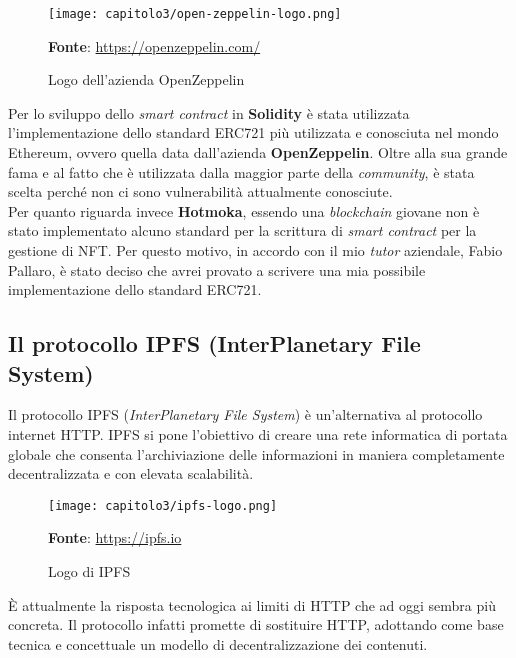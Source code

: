 \begin{figure}[h!]
  \centering
  \texttt{[image: capitolo3/open-zeppelin-logo.png]}
  \caption{Logo dell'azienda OpenZeppelin}
  \textbf{Fonte}: \href{https://openzeppelin.com/}{https://openzeppelin.com/}
\end{figure}

Per lo sviluppo dello \textit{smart contract} in \textbf{Solidity} è stata utilizzata l'implementazione dello standard ERC721 più utilizzata e conosciuta nel mondo Ethereum, ovvero quella data dall'azienda \textbf{OpenZeppelin}. Oltre alla sua grande fama e al fatto che è utilizzata dalla maggior parte della \textit{community}, è stata scelta perché non ci sono vulnerabilità attualmente conosciute. \\

Per quanto riguarda invece \textbf{Hotmoka}, essendo una \textit{blockchain} giovane non è stato implementato alcuno standard per la scrittura di \textit{smart contract} per la gestione di NFT. Per questo motivo, in accordo con il mio \textit{tutor} aziendale, Fabio Pallaro, è stato deciso che avrei provato a scrivere una mia possibile implementazione dello standard ERC721.


\subsection{Il protocollo IPFS (InterPlanetary File System)}
Il protocollo IPFS (\textit{InterPlanetary File System}) è un'alternativa al protocollo internet HTTP. IPFS si pone l'obiettivo di creare una rete informatica di portata globale che consenta l'archiviazione delle informazioni in maniera completamente decentralizzata e con elevata scalabilità.

\begin{figure}[h!]
  \centering
  \texttt{[image: capitolo3/ipfs-logo.png]}
  \caption{Logo di IPFS}
  \textbf{Fonte}: \href{https://ipfs.io}{https://ipfs.io}
\end{figure}

È attualmente la risposta tecnologica ai limiti di HTTP che ad oggi sembra più concreta. Il protocollo infatti promette di sostituire HTTP, adottando come base tecnica e concettuale un modello di decentralizzazione dei contenuti.

